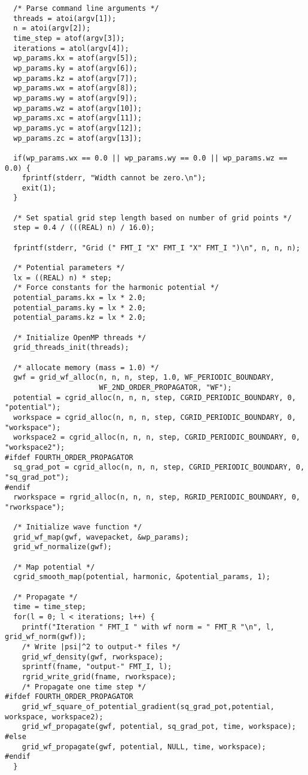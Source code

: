 \documentclass[12pt,letterpaper]{report}
\begin{document}
\begin{verbatim}
  /* Parse command line arguments */
  threads = atoi(argv[1]);
  n = atoi(argv[2]);
  time_step = atof(argv[3]);
  iterations = atol(argv[4]);
  wp_params.kx = atof(argv[5]);
  wp_params.ky = atof(argv[6]);
  wp_params.kz = atof(argv[7]);
  wp_params.wx = atof(argv[8]);
  wp_params.wy = atof(argv[9]);
  wp_params.wz = atof(argv[10]);
  wp_params.xc = atof(argv[11]);
  wp_params.yc = atof(argv[12]);
  wp_params.zc = atof(argv[13]);

  if(wp_params.wx == 0.0 || wp_params.wy == 0.0 || wp_params.wz == 0.0) {
    fprintf(stderr, "Width cannot be zero.\n");
    exit(1);
  }
  
  /* Set spatial grid step length based on number of grid points */
  step = 0.4 / (((REAL) n) / 16.0);
  
  fprintf(stderr, "Grid (" FMT_I "X" FMT_I "X" FMT_I ")\n", n, n, n);
  
  /* Potential parameters */
  lx = ((REAL) n) * step;
  /* Force constants for the harmonic potential */
  potential_params.kx = lx * 2.0;
  potential_params.ky = lx * 2.0;
  potential_params.kz = lx * 2.0;
  
  /* Initialize OpenMP threads */
  grid_threads_init(threads);
  
  /* allocate memory (mass = 1.0) */
  gwf = grid_wf_alloc(n, n, n, step, 1.0, WF_PERIODIC_BOUNDARY, 
                      WF_2ND_ORDER_PROPAGATOR, "WF");
  potential = cgrid_alloc(n, n, n, step, CGRID_PERIODIC_BOUNDARY, 0, "potential");
  workspace = cgrid_alloc(n, n, n, step, CGRID_PERIODIC_BOUNDARY, 0, "workspace");
  workspace2 = cgrid_alloc(n, n, n, step, CGRID_PERIODIC_BOUNDARY, 0, "workspace2");
#ifdef FOURTH_ORDER_PROPAGATOR
  sq_grad_pot = cgrid_alloc(n, n, n, step, CGRID_PERIODIC_BOUNDARY, 0, "sq_grad_pot");
#endif
  rworkspace = rgrid_alloc(n, n, n, step, RGRID_PERIODIC_BOUNDARY, 0, "rworkspace");
  
  /* Initialize wave function */
  grid_wf_map(gwf, wavepacket, &wp_params);
  grid_wf_normalize(gwf);
  
  /* Map potential */
  cgrid_smooth_map(potential, harmonic, &potential_params, 1);
  
  /* Propagate */
  time = time_step;
  for(l = 0; l < iterations; l++) {
    printf("Iteration " FMT_I " with wf norm = " FMT_R "\n", l, grid_wf_norm(gwf));
    /* Write |psi|^2 to output-* files */
    grid_wf_density(gwf, rworkspace);
    sprintf(fname, "output-" FMT_I, l);
    rgrid_write_grid(fname, rworkspace);
    /* Propagate one time step */
#ifdef FOURTH_ORDER_PROPAGATOR
    grid_wf_square_of_potential_gradient(sq_grad_pot,potential, workspace, workspace2);
    grid_wf_propagate(gwf, potential, sq_grad_pot, time, workspace);
#else
    grid_wf_propagate(gwf, potential, NULL, time, workspace);
#endif
  }


\end{verbatim}
\end{document}
